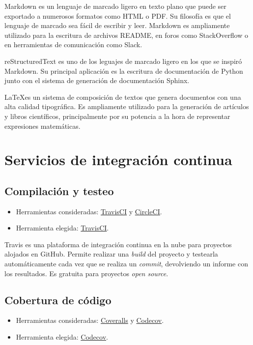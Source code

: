 Markdown es un lenguaje de marcado ligero en texto plano que puede ser
exportado a numerosos formatos como HTML o PDF. Su filosofía es que el
lenguaje de marcado sea fácil de escribir y leer. Markdown es
ampliamente utilizado para la escritura de archivos README, en foros
como StackOverflow o en herramientas de comunicación como Slack.

reStructuredText es uno de los leguajes de marcado ligero en los que se 
inspiró Markdown. Su principal aplicación es la escritura de documentación 
de Python junto con el sistema de generación de documentación Sphinx.

\LaTeX es un sistema de composición de textos que genera documentos con
una alta calidad tipográfica. Es ampliamente utilizado para la
generación de artículos y libros científicos, principalmente por su
potencia a la hora de representar expresiones matemáticas.

\section{Servicios de integración
continua}\label{servicios-de-integraciuxf3n-continua}

\subsection{Compilación y testeo}\label{compilacion-y-testeo}

\begin{itemize}
\tightlist
\item
  Herramientas consideradas: \href{https://travis-ci.org/}{TravisCI} y
  \href{https://circleci.com/}{CircleCI}.
\item
  Herramienta elegida: \href{https://travis-ci.org/}{TravisCI}.
\end{itemize}

Travis es una plataforma de integración continua en la nube para
proyectos alojados en GitHub. Permite realizar una \emph{build} del
proyecto y testearla automáticamente cada vez que se realiza un
\emph{commit}, devolviendo un informe con los resultados. Es gratuita
para proyectos \emph{open source}.

\subsection{Cobertura de código}\label{cobertura-de-codigo}

\begin{itemize}
\tightlist
\item
  Herramientas consideradas: \href{https://coveralls.io/}{Coveralls} y
  \href{https://codecov.io/}{Codecov}.
\item
  Herramienta elegida: \href{https://codecov.io/}{Codecov}.
\end{itemize}

